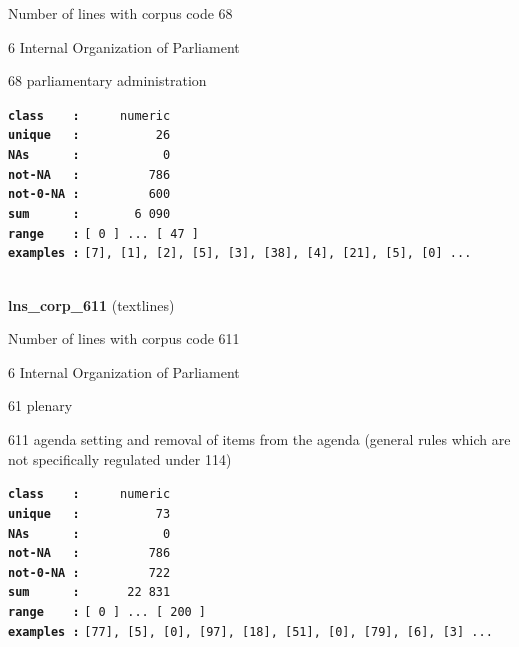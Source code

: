 \documentclass[]{article}
\begin{document}
Number of lines with corpus code 68

6 Internal Organization of Parliament

68 parliamentary administration

\textbf{\texttt{class\ \ \ \ :}} \texttt{~~~~~numeric}\\
\textbf{\texttt{unique\ \ \ :}} \texttt{~~~~~~~~~~26}\\
\textbf{\texttt{NAs\ \ \ \ \ \ :}} \texttt{~~~~~~~~~~~0}\\
\textbf{\texttt{not-NA\ \ \ :}} \texttt{~~~~~~~~~786}\\
\textbf{\texttt{not-0-NA\ :}} \texttt{~~~~~~~~~600}\\
\textbf{\texttt{sum\ \ \ \ \ \ :}} \texttt{~~~~~~~6~090}\\
\textbf{\texttt{range\ \ \ \ :}}
\texttt{{[}\ 0\ {]}\ ...\ {[}\ 47\ {]}}\\
\textbf{\texttt{examples\ :}}
\texttt{{[}7{]},\ {[}1{]},\ {[}2{]},\ {[}5{]},\ {[}3{]},\ {[}38{]},\ {[}4{]},\ {[}21{]},\ {[}5{]},\ {[}0{]}\ ...}\\

~

\textbf{lns\_corp\_611} (textlines)

Number of lines with corpus code 611

6 Internal Organization of Parliament

61 plenary

611 agenda setting and removal of items from the agenda (general rules
which are not specifically regulated under 114)

\textbf{\texttt{class\ \ \ \ :}} \texttt{~~~~~numeric}\\
\textbf{\texttt{unique\ \ \ :}} \texttt{~~~~~~~~~~73}\\
\textbf{\texttt{NAs\ \ \ \ \ \ :}} \texttt{~~~~~~~~~~~0}\\
\textbf{\texttt{not-NA\ \ \ :}} \texttt{~~~~~~~~~786}\\
\textbf{\texttt{not-0-NA\ :}} \texttt{~~~~~~~~~722}\\
\textbf{\texttt{sum\ \ \ \ \ \ :}} \texttt{~~~~~~22~831}\\
\textbf{\texttt{range\ \ \ \ :}}
\texttt{{[}\ 0\ {]}\ ...\ {[}\ 200\ {]}}\\
\textbf{\texttt{examples\ :}}
\texttt{{[}77{]},\ {[}5{]},\ {[}0{]},\ {[}97{]},\ {[}18{]},\ {[}51{]},\ {[}0{]},\ {[}79{]},\ {[}6{]},\ {[}3{]}\ ...}\\

~
\end{document}
